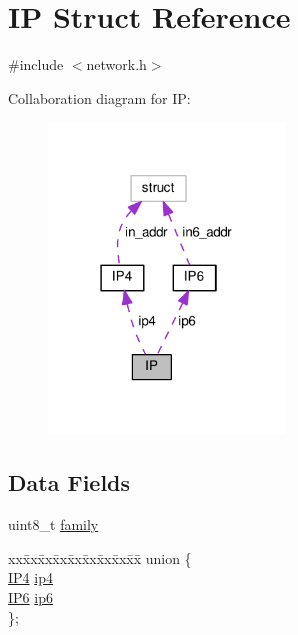 \hypertarget{struct_i_p}{\section{I\+P Struct Reference}
\label{struct_i_p}
}


{\ttfamily \#include $<$network.\+h$>$}



Collaboration diagram for I\+P\+:
\nopagebreak
\begin{figure}[H]
\begin{center}
\leavevmode
\includegraphics[width=178pt]{db/d49/struct_i_p__coll__graph}
\end{center}
\end{figure}
\subsection*{Data Fields}
\begin{DoxyCompactItemize}
\item 
uint8\+\_\+t \hyperlink{struct_i_p_adad4493a852deb413bb8c515368deaac}{family}
\item 
\begin{tabbing}
xx\=xx\=xx\=xx\=xx\=xx\=xx\=xx\=xx\=\kill
union \{\\
\>\hyperlink{union_i_p4}{IP4} \hyperlink{struct_i_p_aca19646000f55aa927406e68fc41ecf9}{ip4}\\
\>\hyperlink{union_i_p6}{IP6} \hyperlink{struct_i_p_a14c606eb5ffb078c38ad854dc4e79507}{ip6}\\
\}; \\

\end{tabbing}\end{DoxyCompactItemize}


